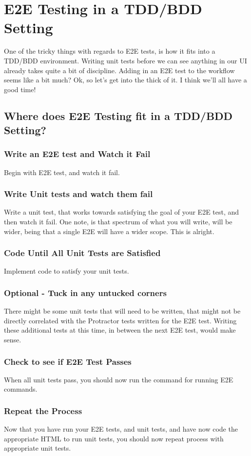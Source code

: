 \maketitle{}
\section{ E2E Testing in a TDD/BDD Setting }

One of the tricky things with regards to E2E tests, is how it fits into a
TDD/BDD environment. Writing unit tests before we can see anything in our UI
already takes quite a bit of discipline. Adding in an E2E test to the workflow
seems like a bit much? Ok, so let's get into the thick of it. I think we'll all
have a good time!

\subsection{ Where does E2E Testing fit in a TDD/BDD Setting? }

\subsubsection{ Write an E2E test and Watch it Fail }
Begin with E2E test, and watch it fail.

\subsubsection{ Write Unit tests and watch them fail }
Write a unit test, that works towards satisfying the goal of your E2E test, and
then watch it fail. One note, is that spectrum of what you will write, will
be wider, being that a single E2E will have a wider scope. This is alright.

\subsubsection{ Code Until All Unit Tests are Satisfied }
Implement code to satisfy your unit tests.

\subsubsection{ Optional - Tuck in any untucked corners }
There might be some unit tests that will need to be written, that might not be
directly correlated with the Protractor tests written for the E2E test. Writing
these additional tests at this time, in between the next E2E test, would make
sense.

\subsubsection{ Check to see if E2E Test Passes }
When all unit tests pass, you should now run the command for running E2E
commands.

\subsubsection{ Repeat the Process }
Now that you have run your E2E tests, and unit tests, and have now code
the appropriate HTML to run unit tests, you should now repeat process with
appropriate unit tests.
